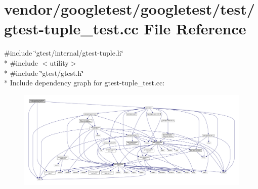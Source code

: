 \hypertarget{gtest-tuple__test_8cc}{}\section{vendor/googletest/googletest/test/gtest-\/tuple\+\_\+test.cc File Reference}
\label{gtest-tuple__test_8cc}
{\ttfamily \#include \char`\"{}gtest/internal/gtest-\/tuple.\+h\char`\"{}}\\*
{\ttfamily \#include $<$utility$>$}\\*
{\ttfamily \#include \char`\"{}gtest/gtest.\+h\char`\"{}}\\*
Include dependency graph for gtest-\/tuple\+\_\+test.cc\+:
\nopagebreak
\begin{figure}[H]
\begin{center}
\leavevmode
\includegraphics[width=350pt]{gtest-tuple__test_8cc__incl}
\end{center}
\end{figure}
